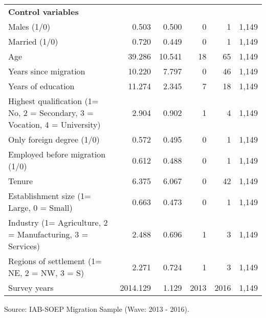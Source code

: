 \documentclass[12pt,a4paper]{article}
\begin{document}
\begin{center}
\begin{table}[htbp]
{\begin{tabular}{lrrrrr}
    \textbf{Control variables} &       &       &       &       &  \\
    Males (1/0) & 0.503 & 0.500 & 0     & 1     & 1,149 \\
    Married (1/0) & 0.720 & 0.449 & 0     & 1     & 1,149 \\
    Age   & 39.286 & 10.541 & 18    & 65    & 1,149 \\
    Years since migration & 10.220 & 7.797 & 0     & 46    & 1,149 \\
    Years of education & 11.274 & 2.345 & 7     & 18    & 1,149 \\
    \multicolumn{1}{p{21.85em}}{Highest qualification (1= No, 2 = Secondary, 3 = Vocation, 4 = University)} & 2.904 & 0.902 & 1     & 4     & 1,149 \\
    Only foreign degree (1/0) & 0.572 & 0.495 & 0     & 1     & 1,149 \\
    Employed before migration (1/0) & 0.612 & 0.488 & 0     & 1     & 1,149 \\
    Tenure & 6.375 & 6.067 & 0     & 42    & 1,149 \\
    Establishment size (1= Large, 0 = Small) & 0.663 & 0.473 & 0     & 1     & 1,149 \\
    \multicolumn{1}{p{21.85em}}{Industry (1= Agriculture, 2 = Manufacturing, 3 = Services)} & 2.488 & 0.696 & 1     & 3     & 1,149 \\
    \multicolumn{1}{p{21.85em}}{Regions of settlement (1= NE, 2 = NW, 3 = S)} & 2.271 & 0.724 & 1     & 3     & 1,149 \\
    Survey years & 2014.129 & 1.129 & 2013  & 2016  & 1,149 \\
    \bottomrule
    \end{tabular}%
 }
 \begin{tablenotes}
      \small
      \item Source: IAB-SOEP Migration Sample (Wave: 2013 - 2016).
    \end{tablenotes}
\end{table}%
\end{center}
\end{document}
